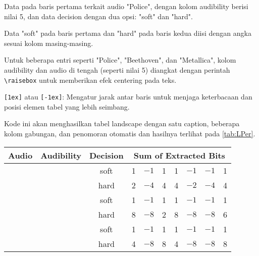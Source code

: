 \begin{packed_enum}
        \begin{packed_enum}
            \item Data pada baris pertama terkait audio "Police", dengan kolom audibility berisi nilai 5, dan data decision dengan dua opsi: "soft" dan "hard".
            \item Data "soft" pada baris pertama dan "hard" pada baris kedua diisi dengan angka sesuai kolom masing-masing.
            \item Untuk beberapa entri seperti "Police", "Beethoven", dan "Metallica", kolom audibility dan audio di tengah (seperti nilai 5) diangkat dengan perintah \texttt{\textbackslash raisebox} untuk memberikan efek centering pada teks.
        \end{packed_enum}
    \item \texttt{[1ex]} atau \texttt{[-1ex]}: Mengatur jarak antar baris untuk menjaga keterbacaan dan posisi elemen tabel yang lebih seimbang.
\end{packed_enum}

Kode ini akan menghasilkan tabel landscape dengan satu caption, beberapa kolom gabungan, dan penomoran otomatis dan hasilnya terlihat pada \cref{tab:LPer}.

\begin{sidewaystable}[htbp]
    \caption{Performance After Post Filtering}
    \label{tab:LPer}
    \centering
    \begin{tabular}{l c c rrrrrrr}
        \hline\hline
        Audio &Audibility & Decision &\multicolumn{7}{c}{Sum of Extracted Bits} 
        \\ [0.5ex] 
        \hline
        & &soft &1 & $-1$ & 1 & 1 & $-1$ & $-1$ & 1 \\[-1ex]
        \raisebox{1.5ex}{Police} & \raisebox{1.5ex}{5}&hard
        & 2 & $-4$ & 4 & 4 & $-2$ & $-4$ & 4 \\[1ex]
        & &soft & 1 & $-1$ & 1 & 1 & $-1$ & $-1$ & 1 \\[-1ex]
        \raisebox{1.5ex}{Beethoven} & \raisebox{1.5ex}{5}& hard
        &8 & $-8$ & 2 & 8 & $-8$ & $-8$ & 6 \\[1ex]
        & &soft & 1 & $-1$ & 1 & 1 & $-1$ & $-1$ & 1 \\[-1ex]
        \raisebox{1.5ex}{Metallica} & \raisebox{1.5ex}{5}& hard
        &4 & $-8$ & 8 & 4 & $-8$ & $-8$ & 8 \\[1ex]
        \hline
    \end{tabular}
\end{sidewaystable}


